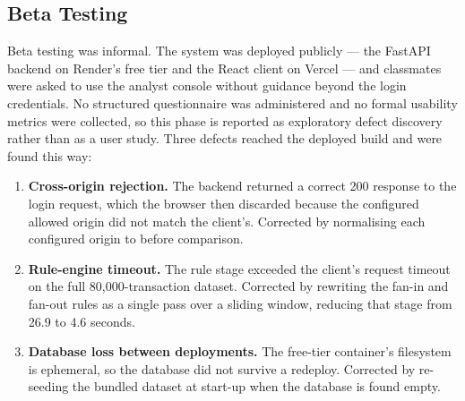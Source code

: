 \subsection{Beta Testing}
Beta testing was informal. The system was deployed publicly --- the FastAPI backend on Render's free tier and the React client on Vercel --- and classmates were asked to use the analyst console without guidance beyond the login credentials. No structured questionnaire was administered and no formal usability metrics were collected, so this phase is reported as exploratory defect discovery rather than as a user study. Three defects reached the deployed build and were found this way:

\begin{enumerate}
  \item \textbf{Cross-origin rejection.} The backend returned a correct 200 response to the login request, which the browser then discarded because the configured allowed origin did not match the client's. Corrected by normalising each configured origin to  before comparison.
  \item \textbf{Rule-engine timeout.} The rule stage exceeded the client's request timeout on the full 80,000-transaction dataset. Corrected by rewriting the fan-in and fan-out rules as a single pass over a sliding window, reducing that stage from 26.9 to 4.6 seconds.
  \item \textbf{Database loss between deployments.} The free-tier container's filesystem is ephemeral, so the database did not survive a redeploy. Corrected by re-seeding the bundled dataset at start-up when the database is found empty.
\end{enumerate}

